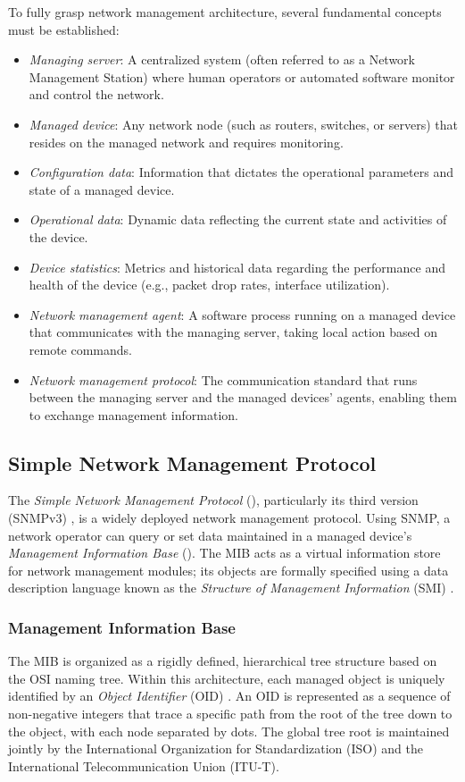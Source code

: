 To fully grasp network management architecture, several fundamental concepts must be established:
\begin{itemize}
    \item \emph{Managing server}: A centralized system (often referred to as a Network Management Station) where human operators or automated software monitor and control the network.
    \item \emph{Managed device}: Any network node (such as routers, switches, or servers) that resides on the managed network and requires monitoring.
    \item \emph{Configuration data}: Information that dictates the operational parameters and state of a managed device.
    \item \emph{Operational data}: Dynamic data reflecting the current state and activities of the device.
    \item \emph{Device statistics}: Metrics and historical data regarding the performance and health of the device (e.g., packet drop rates, interface utilization).
    \item \emph{Network management agent}: A software process running on a managed device that communicates with the managing server, taking local action based on remote commands.
    \item \emph{Network management protocol}: The communication standard that runs between the managing server and the managed devices' agents, enabling them to exchange management information.
\end{itemize}

\subsection{Simple Network Management Protocol}
The \emph{Simple Network Management Protocol} (), particularly its third version (SNMPv3) \cite{rfc3411}, is a widely deployed network management protocol.
Using SNMP, a network operator can query or set data maintained in a managed device's \emph{Management Information Base} ().
The MIB acts as a virtual information store for network management modules; its objects are formally specified using a data description language known as the \emph{Structure of Management Information} (SMI) \cite{rfc2578}.

\subsubsection{Management Information Base}
The MIB is organized as a rigidly defined, hierarchical tree structure based on the OSI naming tree. Within this architecture, each managed object is uniquely identified by an \emph{Object Identifier} (OID) \cite{rfc2578}.
An OID is represented as a sequence of non-negative integers that trace a specific path from the root of the tree down to the object, with each node separated by dots. The global tree root is maintained jointly by the International Organization for Standardization (ISO) and the International Telecommunication Union (ITU-T).

